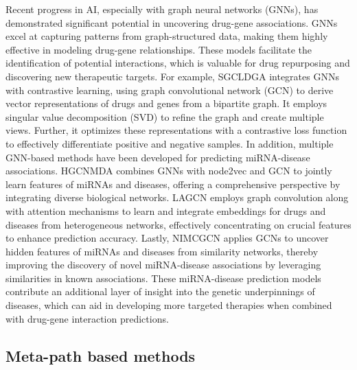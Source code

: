 Recent progress in AI, especially with graph neural networks (GNNs), has demonstrated significant potential in uncovering drug-gene associations. GNNs excel at capturing patterns from graph-structured data, making them highly effective in modeling drug-gene relationships. These models facilitate the identification of potential interactions, which is valuable for drug repurposing and discovering new therapeutic targets. For example, SGCLDGA \cite{fan2024sgcldga} integrates GNNs with contrastive learning, using graph convolutional network (GCN)  \cite{zhang2019graph} to derive vector representations of drugs and genes from a bipartite graph. It employs singular value decomposition (SVD) to refine the graph and create multiple views. Further, it optimizes these representations with a contrastive loss function to effectively differentiate positive and negative samples. In addition, multiple GNN-based methods have been developed for predicting miRNA-disease associations. HGCNMDA \cite{li2019novel} combines GNNs with node2vec and GCN to jointly learn features of miRNAs and diseases, offering a comprehensive perspective by integrating diverse biological networks. LAGCN \cite{yu2021predicting} employs graph convolution along with attention mechanisms to learn and integrate embeddings for drugs and diseases from heterogeneous networks, effectively concentrating on crucial features to enhance prediction accuracy. Lastly, NIMCGCN \cite{li2020neural} applies GCNs to uncover hidden features of miRNAs and diseases from similarity networks, thereby improving the discovery of novel miRNA-disease associations by leveraging similarities in known associations. These miRNA-disease prediction models contribute an additional layer of insight into the genetic underpinnings of diseases, which can aid in developing more targeted therapies when combined with drug-gene interaction predictions.

\subsection{Meta-path based methods}

